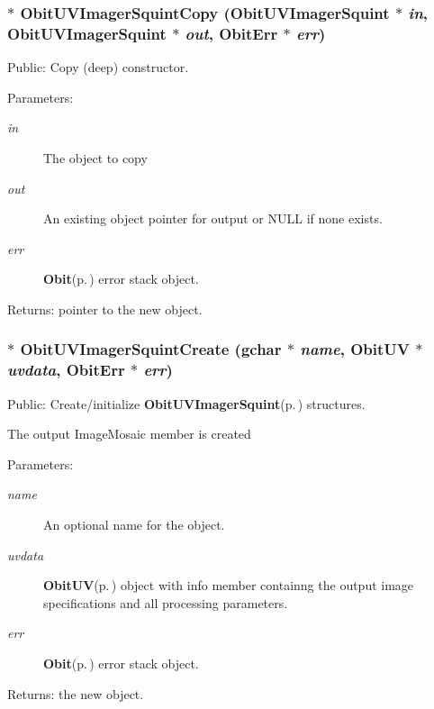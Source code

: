 \subsubsection{$\ast$ Obit\-UVImager\-Squint\-Copy ({\bf Obit\-UVImager\-Squint} $\ast$ {\em in}, {\bf Obit\-UVImager\-Squint} $\ast$ {\em out}, {\bf Obit\-Err} $\ast$ {\em err})}\label{ObitUVImagerSquint_8h_a7}


Public: Copy (deep) constructor. 

\begin{Desc}
\item[Parameters:]
\begin{description}
\item[{\em in}]The object to copy \item[{\em out}]An existing object pointer for output or NULL if none exists. \item[{\em err}]{\bf Obit}{\rm (p.\,\pageref{structObit})} error stack object. \end{description}
\end{Desc}
\begin{Desc}
\item[Returns:]pointer to the new object. \end{Desc}
\subsubsection{$\ast$ Obit\-UVImager\-Squint\-Create (gchar $\ast$ {\em name}, {\bf Obit\-UV} $\ast$ {\em uvdata}, {\bf Obit\-Err} $\ast$ {\em err})}\label{ObitUVImagerSquint_8h_a9}


Public: Create/initialize {\bf Obit\-UVImager\-Squint}{\rm (p.\,\pageref{structObitUVImagerSquint})} structures. 

The output Image\-Mosaic member is created \begin{Desc}
\item[Parameters:]
\begin{description}
\item[{\em name}]An optional name for the object. \item[{\em uvdata}]{\bf Obit\-UV}{\rm (p.\,\pageref{structObitUV})} object with info member containng the output image specifications and all processing parameters. \item[{\em err}]{\bf Obit}{\rm (p.\,\pageref{structObit})} error stack object. \end{description}
\end{Desc}
\begin{Desc}
\item[Returns:]the new object. \end{Desc}

